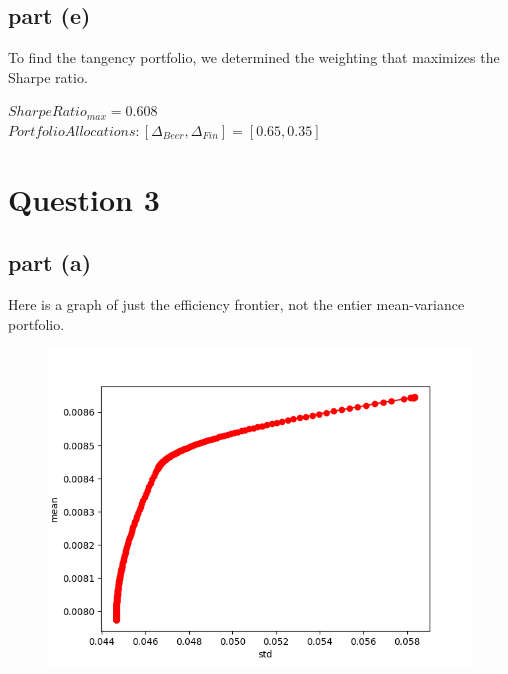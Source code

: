 \documentclass[12pt]{article}
\begin{document}
		\subsection{part (e)}
		
			To find the tangency portfolio, we determined the weighting that maximizes the Sharpe ratio. \\
			
			\begin{center}
				$SharpeRatio_{max} = 0.608$ \\
				$Portfolio Allocations: [\Delta_{Beer}, \Delta_{Fin}] = [0.65, 0.35]$ \\
			\end{center}
		
\section{Question 3}

	\subsection{part (a)}
	
		Here is a graph of just the efficiency frontier, not the entier mean-variance portfolio. 
	
			\begin{figure}[h]
			\centering
				\includegraphics[scale=0.75]{hw1_image3.png}
			\end{figure}
			
\end{document}
